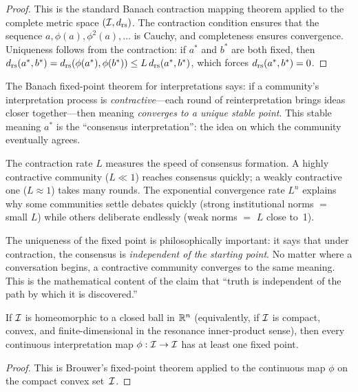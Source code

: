 \begin{proof}
This is the standard Banach contraction mapping theorem applied to
the complete metric space $(\mathcal{I}, d_{\mathrm{rs}})$.  The contraction condition
ensures that the sequence $a, \phi(a), \phi^2(a), \ldots$ is Cauchy,
and completeness ensures convergence.  Uniqueness follows from the
contraction: if $a^*$ and $b^*$ are both fixed, then
$d_{\mathrm{rs}}(a^*, b^*) = d_{\mathrm{rs}}(\phi(a^*), \phi(b^*)) \le L\,
d_{\mathrm{rs}}(a^*, b^*)$, which forces $d_{\mathrm{rs}}(a^*, b^*) = 0$.
\end{proof}

\begin{interpretation}
The Banach fixed-point theorem for interpretations says: if a community's
interpretation process is \emph{contractive}---each round of
reinterpretation brings ideas closer together---then meaning
\emph{converges to a unique stable point}.  This stable meaning
$a^*$ is the ``consensus interpretation'': the idea on which the
community eventually agrees.

The contraction rate $L$ measures the speed of consensus formation.
A highly contractive community ($L \ll 1$) reaches consensus quickly;
a weakly contractive one ($L \approx 1$) takes many rounds.  The
exponential convergence rate $L^n$ explains why some communities
settle debates quickly (strong institutional norms $=$ small $L$)
while others deliberate endlessly (weak norms $=$ $L$ close to~1).

The uniqueness of the fixed point is philosophically important: it says
that under contraction, the consensus is \emph{independent of the
starting point}.  No matter where a conversation begins, a contractive
community converges to the same meaning.  This is the mathematical
content of the claim that ``truth is independent of the path by which
it is discovered.''
\end{interpretation}

\begin{theorem}
\label{thm:brouwer-fixed-point}
If $\mathcal{I}$ is homeomorphic to a closed ball in $\mathbb{R}^n$ (equivalently,
if $\mathcal{I}$ is compact, convex, and finite-dimensional in the resonance
inner-product sense), then every continuous interpretation map
$\phi : \mathcal{I} \to \mathcal{I}$ has at least one fixed point.
\end{theorem}

\begin{proof}
This is Brouwer's fixed-point theorem applied to the continuous map
$\phi$ on the compact convex set~$\mathcal{I}$.
\end{proof}

